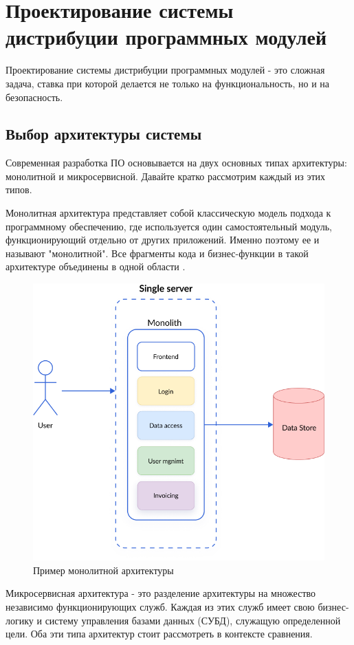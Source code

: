 \chapter{Проектирование системы дистрибуции программных модулей}
\label{cha:design}

Проектирование системы дистрибуции программных модулей - это сложная задача, ставка при которой делается не только на функциональность, но и на безопасность. 

\section{Выбор архитектуры системы}

Современная разработка ПО основывается на двух основных типах архитектуры: монолитной и микросервисной. Давайте кратко рассмотрим каждый из этих типов. 

Монолитная архитектура представляет собой классическую модель подхода к программному обеспечению, где используется один самостоятельный модуль, функционирующий отдельно от других приложений. Именно поэтому ее и называют "монолитной". Все фрагменты кода и бизнес-функции в такой архитектуре объединены в одной области \cite{arch:monovsmicro}.

\begin{figure}
  \centering
  \includegraphics[width=.7\textwidth]{graphics/img/mono.png}
  \caption{Пример монолитной архитектуры}
  \label{fig:mono}
\end{figure}


Микросервисная архитектура - это разделение архитектуры на множество независимо функционирующих служб. Каждая из этих служб имеет свою бизнес-логику и систему управления базами данных (СУБД), служащую определенной цели. Оба эти типа архитектур стоит рассмотреть в контексте сравнения.

